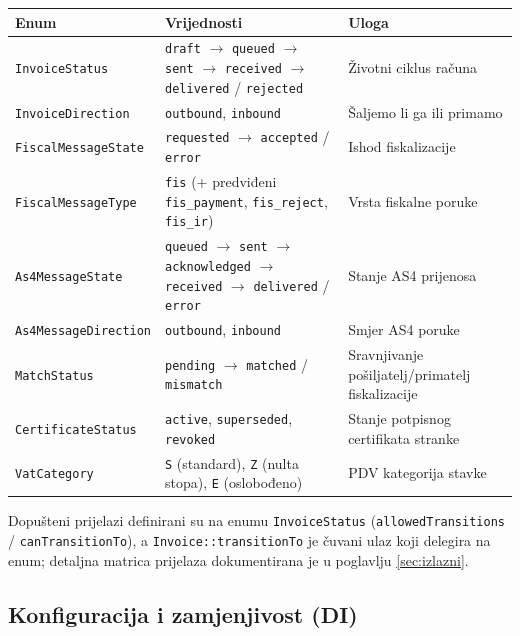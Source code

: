\documentclass[11pt,a4paper]{article}
\renewenvironment{leftbar}{%
  \def\FrameCommand{\hspace{0pt}\vrule width 2pt\hspace{8pt}}%
  \MakeFramed{\advance\hsize-\width \FrameRestore}}%
 {\endMakeFramed}
\begin{document}
\begin{tabularx}{\textwidth}{@{}l >{\raggedright\arraybackslash}X >{\raggedright\arraybackslash}p{3.6cm}@{}}
\toprule
\textbf{Enum} & \textbf{Vrijednosti} & \textbf{Uloga} \\
\midrule
\texttt{InvoiceStatus} & \texttt{draft} $\to$ \texttt{queued} $\to$ \texttt{sent} $\to$ \texttt{received} $\to$ \texttt{delivered} / \texttt{rejected} & Životni ciklus računa \\[2pt]
\texttt{InvoiceDirection} & \texttt{outbound}, \texttt{inbound} & Šaljemo li ga ili primamo \\[2pt]
\texttt{FiscalMessageState} & \texttt{requested} $\to$ \texttt{accepted} / \texttt{error} & Ishod fiskalizacije \\[2pt]
\texttt{FiscalMessageType} & \texttt{fis} (+ predviđeni \texttt{fis\_payment}, \texttt{fis\_reject}, \texttt{fis\_ir}) & Vrsta fiskalne poruke \\[2pt]
\texttt{As4MessageState} & \texttt{queued} $\to$ \texttt{sent} $\to$ \texttt{acknowledged} $\to$ \texttt{received} $\to$ \texttt{delivered} / \texttt{error} & Stanje AS4 prijenosa \\[2pt]
\texttt{As4MessageDirection} & \texttt{outbound}, \texttt{inbound} & Smjer AS4 poruke \\[2pt]
\texttt{MatchStatus} & \texttt{pending} $\to$ \texttt{matched} / \texttt{mismatch} & Sravnjivanje pošiljatelj/primatelj fiskalizacije \\[2pt]
\texttt{CertificateStatus} & \texttt{active}, \texttt{superseded}, \texttt{revoked} & Stanje potpisnog certifikata stranke \\[2pt]
\texttt{VatCategory} & \texttt{S} (standard), \texttt{Z} (nulta stopa), \texttt{E} (oslobođeno) & PDV kategorija stavke \\
\bottomrule
\end{tabularx}

\begin{leftbar}
Dopušteni prijelazi definirani su na enumu \texttt{InvoiceStatus} (\texttt{allowedTransitions} /
\texttt{canTransitionTo}), a \texttt{Invoice::transitionTo} je čuvani ulaz koji delegira na enum;
detaljna matrica prijelaza dokumentirana je u poglavlju \ref{sec:izlazni}.
\end{leftbar}

\subsection{Konfiguracija i zamjenjivost (DI)}\label{sec:di}
\end{document}

